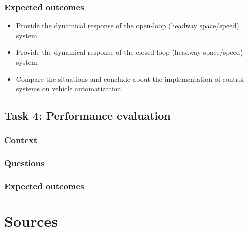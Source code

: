 \documentclass[]{book}
\providecommand{\tightlist}{%
  \setlength{\itemsep}{0pt}\setlength{\parskip}{0pt}}
\theoremstyle{definition}
\theoremstyle{definition}
\theoremstyle{definition}
\theoremstyle{remark}
\begin{document}
\hypertarget{expected-outcomes-6}{%
\subsubsection*{Expected outcomes}\label{expected-outcomes-6}}

\begin{itemize}
\tightlist
\item
  Provide the dynamical response of the open-loop (headway space/speed)
  system.
\item
  Provide the dynamical response of the closed-loop (headway
  space/speed) system.
\item
  Compare the situations and conclude about the implementation of
  control systems on vehicle automatization.
\end{itemize}

\hypertarget{task-4-performance-evaluation-1}{%
\subsection*{Task 4: Performance
evaluation}\label{task-4-performance-evaluation-1}}

\hypertarget{context-8}{%
\subsubsection*{Context}\label{context-8}}

\hypertarget{questions-7}{%
\subsubsection*{Questions}\label{questions-7}}

\hypertarget{expected-outcomes-7}{%
\subsubsection*{Expected outcomes}\label{expected-outcomes-7}}

\hypertarget{sources-1}{%
\section*{Sources}\label{sources-1}}
\end{document}
